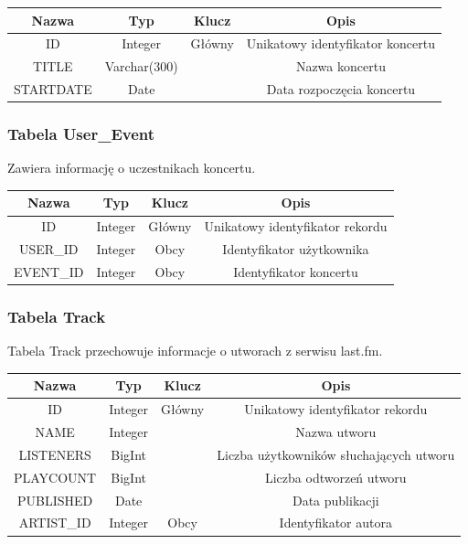 \documentclass[10pt,a4paper,epic,carom]{article}
\begin{document}
\begin{table}[H]
  \centering
    \begin{tabular}{cccc}
    \addlinespace
    \toprule
    Nazwa & Typ   & Klucz & Opis \\
    \midrule
    ID    & Integer & Główny & Unikatowy identyfikator koncertu \\
    TITLE & Varchar(300) &       & Nazwa koncertu \\
    STARTDATE & Date  &       & Data rozpoczęcia koncertu \\
    \bottomrule
    \end{tabular}
  \label{tab:addlabel}
\end{table}

\subsubsection {Tabela User\_Event}
Zawiera informację o uczestnikach koncertu.

\begin{table}[H]
  \centering
    \begin{tabular}{cccc}
    \addlinespace
    \toprule
    Nazwa & Typ   & Klucz & Opis \\
    \midrule
    ID    & Integer & Główny & Unikatowy identyfikator rekordu \\
    USER\_ID & Integer & Obcy  & Identyfikator użytkownika \\
    EVENT\_ID & Integer & Obcy  & Identyfikator koncertu \\
    \bottomrule
    \end{tabular}
  \label{tab:addlabel}
\end{table}

\subsubsection {Tabela Track}
Tabela Track przechowuje informacje o utworach z serwisu last.fm.

\begin{table}[H]
  \centering
    \begin{tabular}{cccc}
    \addlinespace
    \toprule
    Nazwa & Typ   & Klucz & Opis \\
    \midrule
    ID    & Integer & Główny & Unikatowy identyfikator rekordu \\
    NAME  & Integer &       & Nazwa utworu \\
    LISTENERS & BigInt &       & Liczba użytkowników słuchających utworu \\
    PLAYCOUNT & BigInt &       & Liczba odtworzeń utworu \\
    PUBLISHED & Date  &       & Data publikacji \\
    ARTIST\_ID & Integer & Obcy  & Identyfikator autora \\
    \bottomrule
    \end{tabular}
  \label{tab:addlabel}
\end{table}
\end{document}
